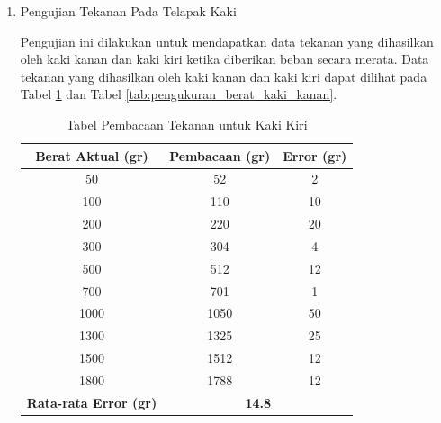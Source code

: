 \begin{enumerate}[label=\Alph*.]
    \item Pengujian Tekanan Pada Telapak Kaki
    \label{subsec:hasil-pembahasan-tekanan}

        \hspace*{1em} Pengujian ini dilakukan untuk mendapatkan data tekanan yang dihasilkan oleh kaki kanan dan kaki kiri ketika diberikan beban secara merata. Data tekanan yang dihasilkan oleh kaki kanan dan kaki kiri dapat dilihat pada Tabel \ref{tab:pengukuran_berat_kaki_kiri} dan Tabel \ref{tab:pengukuran_berat_kaki_kanan}.

        \begin{table}[h!]
            \centering
            \caption{Tabel Pembacaan Tekanan untuk Kaki Kiri}
            \begin{tabular}{|c|c|c|}
                \hline
                \textbf{Berat Aktual (gr)} & \textbf{Pembacaan (gr)} & \textbf{Error (gr)} \\
                \hline
                50    & 52    & 2   \\
                100   & 110   & 10  \\
                200   & 220   & 20  \\
                300   & 304   & 4   \\
                500   & 512   & 12  \\
                700   & 701   & 1   \\
                1000  & 1050  & 50  \\
                1300  & 1325  & 25  \\
                1500  & 1512  & 12  \\
                1800  & 1788  & 12  \\
                \hline
                \textbf{Rata-rata Error (gr)} & \multicolumn{2}{c|}{\textbf{14.8}} \\
                \hline
            \end{tabular}
            \label{tab:pengukuran_berat_kaki_kiri}
        \end{table}


\end{enumerate}
